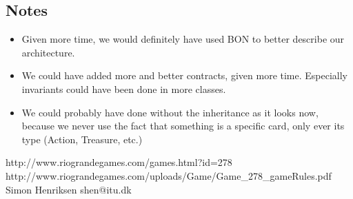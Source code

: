 \documentclass[12pt,a4paper,notitlepage]{article}
\begin{document}
\subsection{Notes}
\begin{itemize}
\item Given more time, we would definitely have used BON to better describe our architecture.
\item We could have added more and better contracts, given more time. Especially invariants could have been done in more classes.
\item We could probably have done without the inheritance as it looks now, because we never use the fact that something is a specific card, only ever its type (Action, Treasure, etc.)
\end{itemize}

\pagebreak

\pagebreak

\pagebreak





\begin{thebibliography}{9}
 http://www.riograndegames.com/games.html?id=278
 http://www.riograndegames.com/uploads/Game/Game\_278\_gameRules.pdf
 Simon Henriksen shen{\makeatletter @\makeatother}itu.dk
\end{thebibliography}
\end{document}
